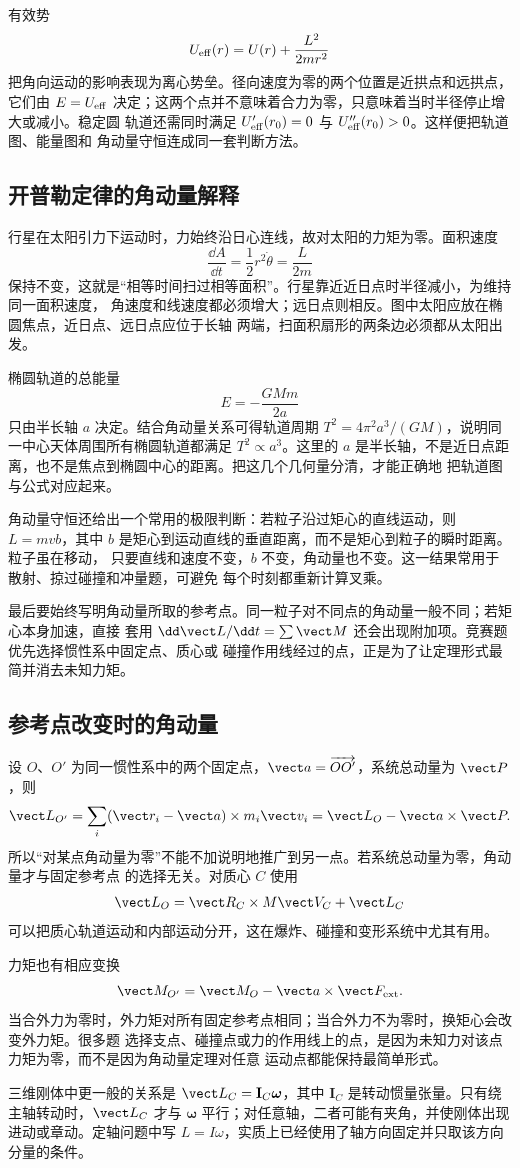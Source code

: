 有效势
\[
 U_{\rm eff}(r)=U(r)+\frac{L^2}{2mr^2}
\]
把角向运动的影响表现为离心势垒。径向速度为零的两个位置是近拱点和远拱点，它们由
$E=U_{\rm eff}$ 决定；这两个点并不意味着合力为零，只意味着当时半径停止增大或减小。稳定圆
轨道还需同时满足 $U'_{\rm eff}(r_0)=0$ 与 $U''_{\rm eff}(r_0)>0$。这样便把轨道图、能量图和
角动量守恒连成同一套判断方法。

\subsection*{开普勒定律的角动量解释}

行星在太阳引力下运动时，力始终沿日心连线，故对太阳的力矩为零。面积速度
\[
 \frac{\dd A}{\dd t}=\frac12r^2\dot\theta=\frac{L}{2m}
\]
保持不变，这就是“相等时间扫过相等面积”。行星靠近近日点时半径减小，为维持同一面积速度，
角速度和线速度都必须增大；远日点则相反。图中太阳应放在椭圆焦点，近日点、远日点应位于长轴
两端，扫面积扇形的两条边必须都从太阳出发。

椭圆轨道的总能量
\[
 E=-\frac{GMm}{2a}
\]
只由半长轴 $a$ 决定。结合角动量关系可得轨道周期
$T^2=4\pi^2a^3/(GM)$，说明同一中心天体周围所有椭圆轨道都满足 $T^2\propto a^3$。这里的
$a$ 是半长轴，不是近日点距离，也不是焦点到椭圆中心的距离。把这几个几何量分清，才能正确地
把轨道图与公式对应起来。

角动量守恒还给出一个常用的极限判断：若粒子沿过矩心的直线运动，则
$L=mvb$，其中 $b$ 是矩心到运动直线的垂直距离，而不是矩心到粒子的瞬时距离。粒子虽在移动，
只要直线和速度不变，$b$ 不变，角动量也不变。这一结果常用于散射、掠过碰撞和冲量题，可避免
每个时刻都重新计算叉乘。

最后要始终写明角动量所取的参考点。同一粒子对不同点的角动量一般不同；若矩心本身加速，直接
套用 $\dd\vect L/\dd t=\sum\vect M$ 还会出现附加项。竞赛题优先选择惯性系中固定点、质心或
碰撞作用线经过的点，正是为了让定理形式最简并消去未知力矩。

\subsection*{参考点改变时的角动量}

设 $O$、$O'$ 为同一惯性系中的两个固定点，$\vect a=\overrightarrow{OO'}$，系统总动量为
$\vect P$，则
\[
 \vect L_{O'}=\sum_i(\vect r_i-\vect a)\times m_i\vect v_i
 =\vect L_O-\vect a\times\vect P.
\]
所以“对某点角动量为零”不能不加说明地推广到另一点。若系统总动量为零，角动量才与固定参考点
的选择无关。对质心 $C$ 使用
\[
 \vect L_O=\vect R_C\times M\vect V_C+\vect L_C
\]
可以把质心轨道运动和内部运动分开，这在爆炸、碰撞和变形系统中尤其有用。

力矩也有相应变换
\[
 \vect M_{O'}=\vect M_O-\vect a\times\vect F_{\rm ext}.
\]
当合外力为零时，外力矩对所有固定参考点相同；当合外力不为零时，换矩心会改变外力矩。很多题
选择支点、碰撞点或力的作用线上的点，是因为未知力对该点力矩为零，而不是因为角动量定理对任意
运动点都能保持最简单形式。

三维刚体中更一般的关系是 $\vect L_C=\mathbf I_C\boldsymbol\omega$，其中
$\mathbf I_C$ 是转动惯量张量。只有绕主轴转动时，$\vect L_C$ 才与
$\boldsymbol\omega$ 平行；对任意轴，二者可能有夹角，并使刚体出现进动或章动。定轴问题中写
$L=I\omega$，实质上已经使用了轴方向固定并只取该方向分量的条件。
